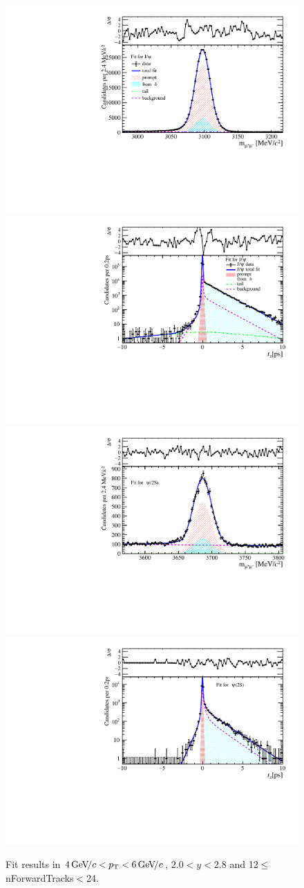 \begin{figure}[H]
\begin{center}
\includegraphics[width=0.47\linewidth]{pdf/Jpsi/drawmassF/n2y1pt3.pdf}
\includegraphics[width=0.47\linewidth]{pdf/Jpsi/2DFitF/n2y1pt3.pdf}
\vspace*{-0.5cm}
\includegraphics[width=0.47\linewidth]{pdf/Psi2S/drawmassF/n2y1pt3.pdf}
\includegraphics[width=0.47\linewidth]{pdf/Psi2S/2DFitF/n2y1pt3.pdf}
\vspace*{-0.5cm}
\end{center}
\caption{Fit results in $4\text{\,Ge\kern -0.1em V\!/}c<p_{\mathrm{T}}<6\text{\,Ge\kern -0.1em V\!/}c$, $2.0<y<2.8$ and 12$\leq$nForwardTracks$<$24.}
\label{Fitn2y1pt3}
\end{figure}
